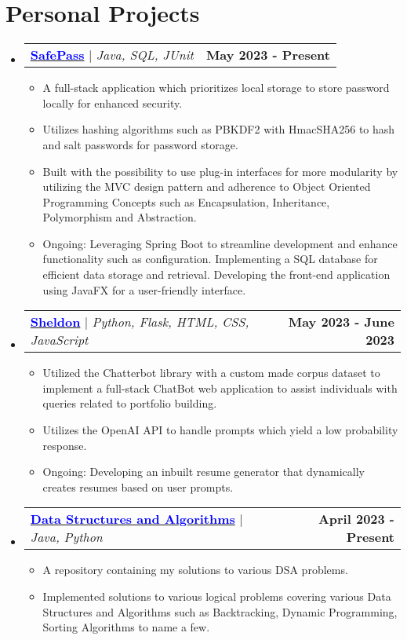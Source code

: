 \documentclass[letterpaper,11pt]{article}
\makeatletter
\newcommand{\resumeItem}[1]{
  \item\small{
    {#1 \vspace{-2pt}}
  }
}
\newcommand{\resumeProjectHeading}[2]{
    \item
    \begin{tabular*}{1.001\textwidth}{l@{\extracolsep{\fill}}r}
      \small#1 & \textbf{\small #2}\\
    \end{tabular*}\vspace{-7pt}
}
\newcommand{\resumeSubHeadingListStart}{\begin{itemize}[leftmargin=0.0in, label={}]}
\newcommand{\resumeSubHeadingListEnd}{\end{itemize}}
\newcommand{\resumeItemListStart}{\begin{itemize}}
\newcommand{\resumeItemListEnd}{\end{itemize}\vspace{-5pt}}
\makeatother
\begin{document}
\section{Personal Projects}
    \vspace{-5pt}
    \resumeSubHeadingListStart
      \resumeProjectHeading
          {\href{https://github.com/ShevinuM/SafePass}{\textcolor{blue}{\textbf{SafePass}}} $|$ \emph{Java, SQL, JUnit}}{May 2023 - Present}
          \resumeItemListStart
            \resumeItem{A full-stack application which prioritizes local storage to store password locally for enhanced security.}
            \resumeItem{Utilizes hashing algorithms such as PBKDF2 with HmacSHA256 to hash and salt passwords for password storage.}
            \resumeItem{Built with the possibility to use plug-in interfaces for more modularity by utilizing the MVC design pattern and adherence to Object Oriented Programming Concepts such as Encapsulation, Inheritance, Polymorphism and Abstraction.}
            \resumeItem{Ongoing: Leveraging Spring Boot to streamline development and enhance functionality such as configuration. Implementing a SQL database for efficient data storage and retrieval. Developing the front-end application using JavaFX for a user-friendly interface.}
          \resumeItemListEnd
          \vspace{-13pt}
      \resumeProjectHeading
          {\href{https://github.com/ShevinuM/Sheldon}{\textcolor{blue}{\textbf{Sheldon}}} $|$ \emph{Python, Flask, HTML, CSS, JavaScript}}{May 2023 - June 2023}
          \resumeItemListStart
            \resumeItem{Utilized the Chatterbot library with a custom made corpus dataset to implement a full-stack ChatBot web application to assist individuals with queries related to portfolio building.}
            \resumeItem{Utilizes the OpenAI API to handle prompts which yield a low probability response.}
            \resumeItem{Ongoing: Developing an inbuilt resume generator that dynamically creates resumes based on user prompts.}
          \resumeItemListEnd 
          \vspace{-13pt}
          \resumeProjectHeading
          {\href{https://github.com/ShevinuM/Data-Structures-And-Algorithms}{\textcolor{blue}{\textbf{Data Structures and Algorithms}}} $|$ \emph{Java, Python}}{April 2023 - Present}
          \resumeItemListStart
            \resumeItem{A repository containing my solutions to various DSA problems.}
            \resumeItem{Implemented solutions to various logical problems covering various Data Structures and Algorithms such as Backtracking, Dynamic Programming, Sorting Algorithms to name a few.}
          \resumeItemListEnd 
    \resumeSubHeadingListEnd
\vspace{-15pt}
\end{document}
